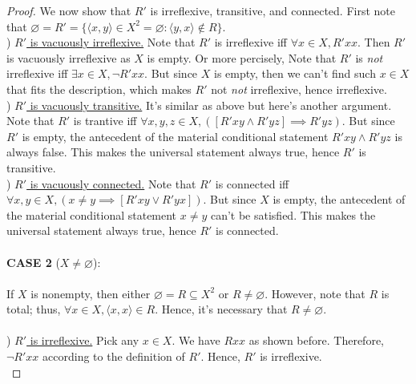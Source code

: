 \documentclass[12pt]{article}
\begin{document}
\begin{proof}
    \noindent We now show that $R'$ is irreflexive, transitive, and connected.
    First note that $\varnothing = R' = \{\langle x,y \rangle \in X^2 = \varnothing: \langle y, x \rangle \notin R\}$.\\

    ) \underline{$R'$ is vacuously irreflexive.} Note that $R'$ is irreflexive iff 
    $\forall x \in X, R'xx$. Then $R'$ is vacuously irreflexive as $X$ is empty.
    Or more percisely, Note that $R'$ is \emph{not} irreflexive iff 
    $\exists x \in X, \neg R'xx$. But since $X$ is empty, then we can't find such $x \in X$
    that fits the description, which makes $R'$ not \emph{not} irreflexive, hence irreflexive.\\

    ) \underline{$R'$ is vacuously transitive.} It's similar as above but here's another argument.
    Note that $R'$ is trantive iff $\forall x,y,z \in X, ([R'xy \wedge R'yz] \implies R'yz)$.
    But since $R'$ is empty, the antecedent of the material conditional statement $R'xy \wedge R'yz$
    is always false. This makes the universal statement always true, hence $R'$ is transitive.\\

    ) \underline{$R'$ is vacuously connected.} Note that $R'$ is connected iff
    $\forall x, y \in X, (x \neq y \implies [R'xy \lor R'yx])$. But since $X$ is empty, the antecedent 
    of the material conditional statement $x \neq y$ can't be satisfied. This makes the universal 
    statement always true, hence $R'$ is connected.\\
    \\
    \textbf{CASE 2 }($X \neq \varnothing$):\\
    \\
    If $X$ is nonempty, then either $\varnothing = R \subseteq X^2$ or $R \neq \varnothing$.
    However, note that $R$ is total; thus, $\forall x \in X, \langle x,x \rangle \in R$.
    Hence, it's necessary that $R \neq \varnothing$.\\
    \\
    ) \underline{$R'$ is irreflexive.}
    Pick any $x \in X$. We have $Rxx$ as shown before.
    Therefore, $\neg R'xx$ according to the definition of $R'$. Hence, $R'$ is irreflexive.\\


\end{proof}
\end{document}

